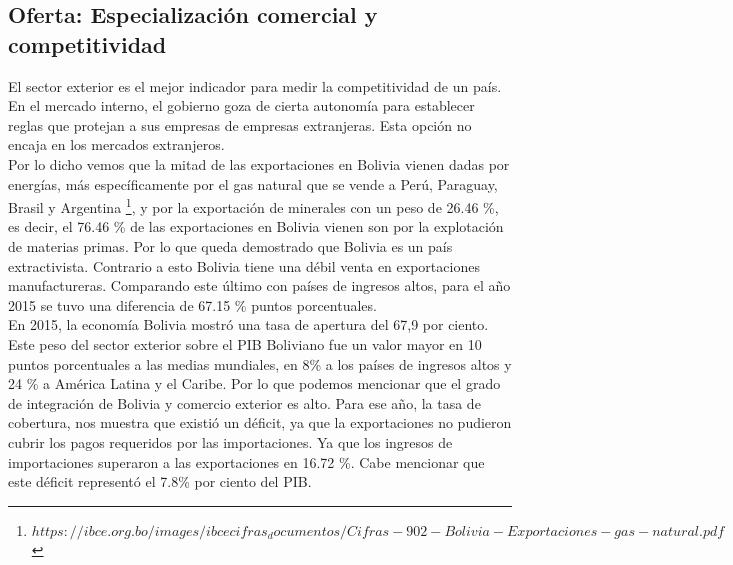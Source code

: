     \subsection{Oferta: Especialización comercial y competitividad}
    El sector exterior es el mejor indicador para medir la competitividad de un país. En el mercado interno, el gobierno goza de cierta autonomía para establecer reglas que protejan a sus empresas de empresas extranjeras. Esta opción no encaja en los mercados extranjeros.\\
    Por lo dicho vemos que la mitad de las exportaciones en Bolivia vienen dadas por energías, más específicamente por el gas natural que se vende a Perú, Paraguay, Brasil y Argentina \footnote{$https://ibce.org.bo/images/ibcecifras_documentos/Cifras-902-Bolivia-Exportaciones-gas-natural.pdf$}, y por la exportación de minerales con un peso de 26.46 \%, es decir, el 76.46 \% de las exportaciones en Bolivia vienen son por la explotación de materias primas. Por lo que queda demostrado que Bolivia es un país extractivista. Contrario a esto Bolivia tiene una débil venta en exportaciones manufactureras. Comparando este último con países de ingresos altos, para el año 2015 se tuvo una diferencia de 67.15 \% puntos porcentuales.\\
    En 2015, la economía Bolivia mostró una tasa de apertura del 67,9 por ciento. Este peso del sector exterior sobre el PIB Boliviano fue un valor mayor en 10 puntos porcentuales a las medias mundiales, en 8\% a los países de ingresos altos y 24 \%  a América Latina y el Caribe. Por lo que podemos mencionar que el grado de integración de Bolivia y comercio exterior es alto. Para ese año, la tasa de cobertura, nos muestra que existió un déficit, ya que la exportaciones no pudieron cubrir los pagos requeridos por las importaciones. Ya que los ingresos de importaciones superaron a las  exportaciones en  16.72 \%. Cabe mencionar que este déficit representó el 7.8\%  por ciento del PIB.\\


